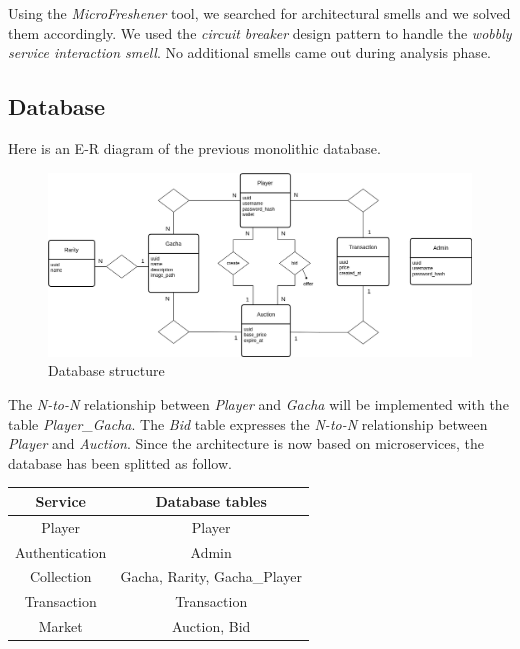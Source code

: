 \documentclass{article}
\begin{document}
Using the \emph{MicroFreshener} tool, we searched for architectural smells and we solved them accordingly. We used the \emph{circuit breaker} design pattern to handle the \emph{wobbly service interaction smell}. No additional smells came out during analysis phase.

\newpage
\subsection{Database}
Here is an E-R diagram of the previous monolithic database.
\begin{figure}[ht]
    \centering
    \includegraphics[width=12cm]{ASE-er-v5.drawio.png}
    \caption{Database structure}
\end{figure}

The \emph{N-to-N} relationship between \emph{Player} and \emph{Gacha} will be implemented with the table \emph{Player\_Gacha}. The \emph{Bid} table expresses the \emph{N-to-N} relationship between \emph{Player} and \emph{Auction}. Since the architecture is now based on microservices, the database has been splitted as follow.
\begin{table}[ht!]
    \centering
    \begin{tabular}{|c|c|}
        \hline
        \textbf{Service} & \textbf{Database tables}     \\
        \hline
        Player           & Player                       \\
        Authentication   & Admin                        \\
        Collection       & Gacha, Rarity, Gacha\_Player \\
        Transaction      & Transaction                  \\
        Market           & Auction, Bid                 \\
        \hline
    \end{tabular}
\end{table}
\end{document}
